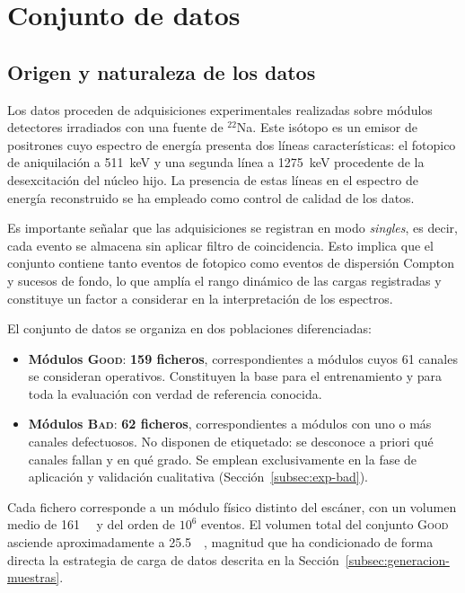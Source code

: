 \section{Conjunto de datos}
\label{sec:datos}

\subsection{Origen y naturaleza de los datos}
\label{subsec:origen-datos}

Los datos proceden de adquisiciones experimentales realizadas sobre módulos detectores irradiados
con una fuente de $^{22}$Na. Este isótopo es un emisor de positrones cuyo espectro de energía
presenta dos líneas características: el fotopico de aniquilación a \SI{511}{\kilo\electronvolt} y
una segunda línea a \SI{1275}{\kilo\electronvolt} procedente de la desexcitación del núcleo hijo.
La presencia de estas líneas en el espectro de energía reconstruido se ha empleado como control de
calidad de los datos.

Es importante señalar que las adquisiciones se registran en modo \emph{singles}, es decir, cada
evento se almacena sin aplicar filtro de coincidencia. Esto implica que el conjunto contiene tanto
eventos de fotopico como eventos de dispersión Compton y sucesos de fondo, lo que amplía el rango
dinámico de las cargas registradas y constituye un factor a considerar en la interpretación de los
espectros.

El conjunto de datos se organiza en dos poblaciones diferenciadas:

\begin{itemize}
    \item \textbf{Módulos \textsc{Good}}: \textbf{159 ficheros}, correspondientes a módulos cuyos
    61 canales se consideran operativos. Constituyen la base para el entrenamiento y para toda la
    evaluación con verdad de referencia conocida.

    \item \textbf{Módulos \textsc{Bad}}: \textbf{62 ficheros}, correspondientes a módulos con uno o
    más canales defectuosos. No disponen de etiquetado: se desconoce a priori qué canales fallan y
    en qué grado. Se emplean exclusivamente en la fase de aplicación y validación cualitativa
    (Sección~\ref{subsec:exp-bad}).
\end{itemize}

Cada fichero corresponde a un módulo físico distinto del escáner, con un volumen medio de
\SI{161}{\mega\byte} y del orden de $10^6$ eventos. El volumen total del conjunto \textsc{Good}
asciende aproximadamente a \SI{25.5}{\giga\byte}, magnitud que ha condicionado de forma directa la
estrategia de carga de datos descrita en la Sección~\ref{subsec:generacion-muestras}.

